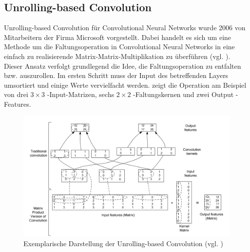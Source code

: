 \documentclass[../main.tex]{subfiles}
\begin{document}
\subsection{Unrolling-based Convolution} \label{sec:cuda_unrolling_conv}
Unrolling-based Convolution für Convolutional Neural Networks wurde 2006 von Mitarbeitern der Firma Microsoft vorgestellt. Dabei handelt es sich um eine Methode um die Faltungsoperation in Convolutional Neural Networks in eine einfach zu realisierende Matrix-Matrix-Multiplikation zu überführen (vgl. \cite{UNROLLING_CONV}). Dieser Ansatz verfolgt grundlegend die Idee, die Faltungsoperation zu entfalten bzw. auszurollen. Im ersten Schritt muss der Input des betreffenden Layers umsortiert und einige Werte vervielfacht werden.   zeigt die Operation am Beispiel von drei $3\times 3$ -Input-Matrizen, sechs $2\times 2$ -Faltungskernen und zwei Output -Features. \par 
\begin{figure}[!htbp]
	\centering
	\includegraphics[width=0.8\linewidth]{../images/Riedle/Unrolling_1.png} \caption{Exemplarische Darstellung der Unrolling-based Convolution (vgl. \cite{UNROLLING_CONV})} \label{fig:cuda_unrolling_1}
\end{figure}
\end{document}
